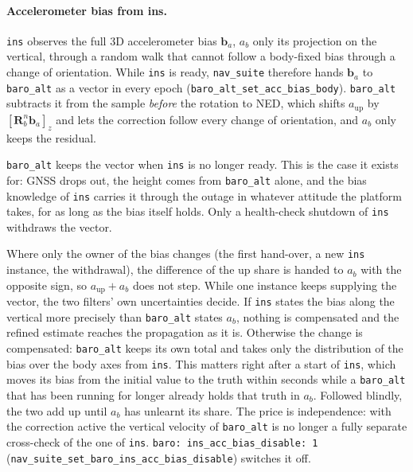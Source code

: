 \documentclass[11pt,a4paper]{article}
\newcommand{\vect}[1]{\bm{#1}}
\newcommand{\mat}[1]{\bm{#1}}
\newcommand{\nframe}{n}
\newcommand{\bframe}{b}
\newcommand{\Rbn}{\mat{R}_{\bframe}^{\nframe}}
\newcommand{\code}[1]{\texttt{#1}}
\begin{document}
\paragraph{Accelerometer bias from ins.} \code{ins} observes the full 3D
accelerometer bias $\vect{b}_a$, $a_b$ only its projection on the vertical,
through a random walk that cannot follow a body-fixed bias through a change of
orientation. While \code{ins} is ready, \code{nav\_\allowbreak{}suite} therefore hands
$\vect{b}_a$ to \code{baro\_\allowbreak{}alt} as a vector in every epoch
(\code{baro\_\allowbreak{}alt\_\allowbreak{}set\_\allowbreak{}acc\_\allowbreak{}bias\_\allowbreak{}body}).
\code{baro\_\allowbreak{}alt} subtracts it from the sample \emph{before} the
rotation to NED, which shifts $a_{\text{up}}$ by $[\Rbn\vect{b}_a]_z$ and lets
the correction follow every change of orientation, and $a_b$ only keeps the
residual.

\code{baro\_\allowbreak{}alt} keeps the vector when \code{ins} is no longer ready.
This is the case it exists for: GNSS drops out, the height comes from
\code{baro\_\allowbreak{}alt} alone, and the bias knowledge of \code{ins} carries
it through the outage in whatever attitude the platform takes, for as long as
the bias itself holds. Only a health-check shutdown of \code{ins} withdraws the
vector.

Where only the owner of the bias changes (the first hand-over, a new
\code{ins} instance, the withdrawal), the difference of the up share is
handed to $a_b$ with the opposite sign, so $a_{\text{up}} + a_b$ does not step.
While one instance keeps supplying the vector, the two filters' own
uncertainties decide. If \code{ins} states the bias along the vertical more
precisely than \code{baro\_\allowbreak{}alt} states $a_b$, nothing is
compensated and the refined estimate reaches the propagation as it is.
Otherwise the change is compensated: \code{baro\_\allowbreak{}alt} keeps its own
total and takes only the distribution of the bias over the body axes from
\code{ins}. This matters right after a start of \code{ins}, which moves its
bias from the initial value to the truth within seconds while a
\code{baro\_\allowbreak{}alt} that has been running for longer already holds that
truth in $a_b$. Followed blindly, the two add up until $a_b$ has unlearnt its
share. The price
is independence: with the correction active the vertical velocity of
\code{baro\_\allowbreak{}alt} is no longer a fully separate cross-check of the one
of \code{ins}. \code{baro: ins\_\allowbreak{}acc\_\allowbreak{}bias\_\allowbreak{}disable: 1}
(\code{nav\_\allowbreak{}suite\_\allowbreak{}set\_\allowbreak{}baro\_\allowbreak{}ins\_\allowbreak{}acc\_\allowbreak{}bias\_\allowbreak{}disable})
switches it off.
\end{document}
